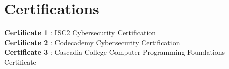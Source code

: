 \documentclass[letterpaper,11pt]{article}
\makeatletter
\newcommand{\resumeItem}[1]{
  \item\small{
    {#1 \vspace{-2pt}}
  }
}
\newcommand{\resumeProjectHeading}[2]{
    \item
    \begin{tabular*}{1.001\textwidth}{l@{\extracolsep{\fill}}r}
      \small#1 & \textbf{\small #2}\\
    \end{tabular*}\vspace{-7pt}
}
\newcommand{\resumeSubHeadingListStart}{\begin{itemize}[leftmargin=0.0in, label={}]}
\newcommand{\resumeSubHeadingListEnd}{\end{itemize}}
\newcommand{\resumeItemListStart}{\begin{itemize}}
\newcommand{\resumeItemListEnd}{\end{itemize}\vspace{-5pt}}
\makeatother
\begin{document}
\begin{comment}
\section{Publication}
\vspace{-6pt}
    \resumeSubHeadingListStart
    \resumeProjectHeading
    {\textbf{The Title of your paper} $|$ 
    \emph{\href{https://www.researchgate.net}{Publication link}}}{Month Year}
    \resumeItemListStart
            \resumeItem{Write about your paper.}
            \resumeItem{Write about your paper.}
          \resumeItemListEnd
    \resumeSubHeadingListEnd
\vspace{-16pt}
\end{comment}

\section{Certifications}
\textbf{Certificate 1} {: ISC2 Cybersecurity Certification} \\
\textbf{Certificate 2} {: Codecademy Cybersecurity Certification} \\
\textbf{Certificate 3} {: Cascadia College Computer Programming Foundations Certificate}
\end{document}
